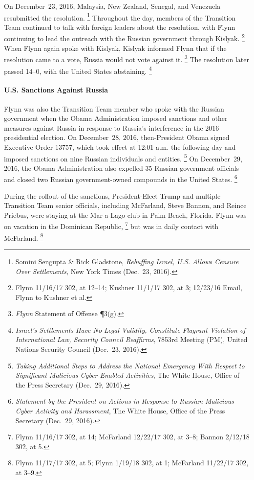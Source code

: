On December~23, 2016, Malaysia, New Zealand, Senegal, and Venezuela resubmitted the resolution.%
\footnote{Somini Sengupta \& Rick Gladstone, \textit{Rebuffing Israel, U.S. Allows Censure Over Settlements}, New York Times (Dec.~23, 2016).}
Throughout the day, members of the Transition Team continued to talk with foreign leaders about the resolution, with Flynn continuing to lead the outreach with the Russian government through Kislyak.%
\footnote{Flynn 11/16/17 302, at 12--14;
Kushner 11/1/17 302, at 3;
12/23/16 Email, Flynn to Kushner et al.}
When Flynn again spoke with Kislyak, Kislyak informed Flynn that if the resolution came to a vote, Russia would not vote against it.%
\footnote{\textit{Flynn} Statement of Offense \P 3(g).}
The resolution later passed 14--0, with the United States abstaining.%
\footnote{\textit{Israel's Settlements Have No Legal Validity, Constitute Flagrant Violation of International Law, Security Council Reaffirms}, 7853rd Meeting (PM), United Nations Security Council (Dec.~23, 2016).}

\paragraph{U.S. Sanctions Against Russia}

Flynn was also the Transition Team member who spoke with the Russian government when the Obama Administration imposed sanctions and other measures against Russia in response to Russia's interference in the 2016 presidential election.
On December~28, 2016, then-President Obama signed Executive Order 13757, which took effect at 12:01 a.m. the following day and imposed sanctions on nine Russian individuals and entities.%
\footnote{\textit{Taking Additional Steps to Address the National Emergency With Respect to Significant Malicious Cyber-Enabled Activities}, The White House, Office of the Press Secretary (Dec.~29, 2016).}
On December~29, 2016, the Obama Administration also expelled 35 Russian government officials and closed two Russian government-owned compounds in the United States.%
\footnote{\textit{Statement by the President on Actions in Response to Russian Malicious Cyber Activity and Harassment}, The White House, Office of the Press Secretary (Dec.~29, 2016).}

During the rollout of the sanctions, President-Elect Trump and multiple Transition Team senior officials, including McFarland, Steve Bannon, and Reince Priebus, were staying at the Mar-a-Lago club in Palm Beach, Florida.
Flynn was on vacation in the Dominican Republic,%
\footnote{Flynn 11/16/17 302, at 14;
McFarland 12/22/17 302, at 3--8;
Bannon 2/12/18 302, at 5.}
but was in daily contact with McFarland.%
\footnote{Flynn 11/17/17 302, at 5;
Flynn 1/19/18 302, at 1;
McFarland 11/22/17 302, at 3--9.}

